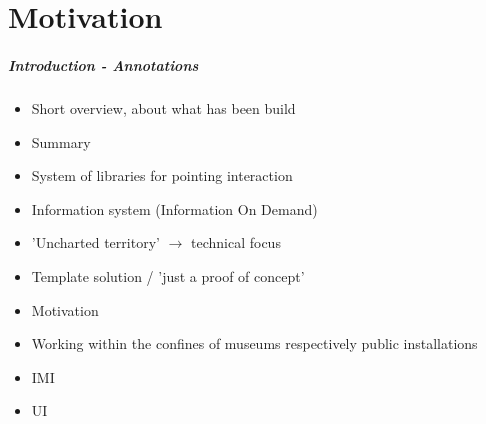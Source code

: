 \chapter{Motivation}
\label{motivation}

%
%

\paragraph{Introduction - Annotations}

\begin{itemize}
	\item Short overview, about what has been build
	\item Summary
	\\
	\item System of libraries for pointing interaction
	\item Information system (Information On Demand)
	\item 'Uncharted territory' $\to$ technical focus
	\item Template solution / 'just a proof of concept'
  \\
	\item Motivation
	\item Working within the confines of museums respectively public installations
	\\
	\item \ac{IMI} %
	\item \ac{UI}
\end{itemize}

